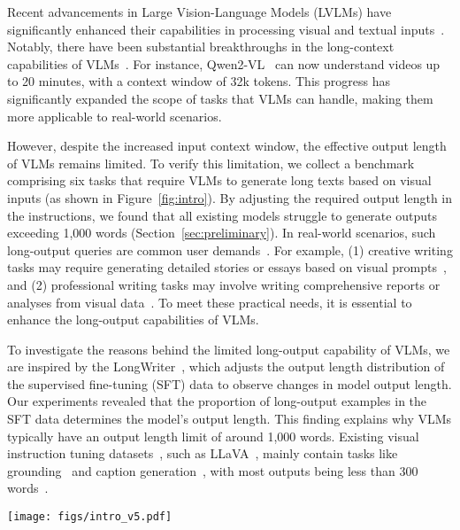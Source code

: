 
Recent advancements in Large Vision-Language Models (LVLMs) have significantly enhanced their capabilities in processing visual and textual inputs~\cite{alayrac2022flamingo,zhang2024vision}.  Notably, there have been substantial breakthroughs in the long-context capabilities of VLMs~\cite{xue2024longvila,shu2024video}. For instance, Qwen2-VL~\cite{wang2024qwen2} can now understand videos up to 20 minutes, with a context window of 32k tokens. This progress has significantly expanded the scope of tasks that VLMs can handle, making them more applicable to real-world scenarios.

However, despite the increased input context window, the effective output length of VLMs remains limited. To verify this limitation, we collect a benchmark comprising six tasks that require VLMs to generate long texts based on visual inputs (as shown in Figure~\ref{fig:intro}). By adjusting the required output length in the instructions, we found that all existing models struggle to generate outputs exceeding 1,000 words (Section~\ref{sec:preliminary}). In real-world scenarios, such long-output queries are common user demands~\cite{chou2024visionarena}. For example, (1) creative writing tasks may require generating detailed stories or essays based on visual prompts~\cite{hong2023visual}, and (2) professional writing tasks may involve writing comprehensive reports or analyses from visual data~\cite{hartsock2024vision}. To meet these practical needs, it is essential to enhance the long-output capabilities of VLMs.


To investigate the reasons behind the limited long-output capability of VLMs, we are inspired by the LongWriter~\cite{bai2024longwriter}, which adjusts the output length distribution of the supervised fine-tuning (SFT) data to observe changes in model output length. Our experiments revealed that the proportion of long-output examples in the SFT data determines the model's output length. This finding explains why VLMs typically have an output length limit of around 1,000 words. Existing visual instruction tuning datasets~\cite{schuhmann2022laion}, such as LLaVA~\cite{liu2024visual}, mainly contain tasks like grounding~\cite{liu2024grounding} and caption generation~\cite{wang2022git}, with most outputs being less than 300 words~\cite{lin2014microsoft}.

\begin{figure*}[t]
    \centering
    \texttt{[image: figs/intro\_v5.pdf]}
    \caption{Left: Six examples for each type of task in MMLongBench-Write. They are divided into two categories: professional writing and creative writing. The former requires professional knowledge, while the latter does not. Right: The joint distribution of the number of input images and the expected output length for data in both categories. Most data requires a 1000+ word output with given images, challenging the long-generation capabilities of VLMs.}
    \label{fig:intro}
\end{figure*}

